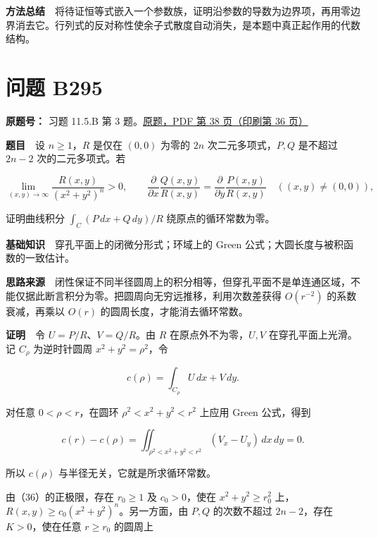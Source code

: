 \documentclass[11pt,a4paper]{article}
\begin{document}
\textbf{方法总结}　将待证恒等式嵌入一个参数族，证明沿参数的导数为边界项，再用零边界消去它。行列式的反对称性使余子式散度自动消失，是本题中真正起作用的代数结构。

\section{问题 B295}\label{ux95eeux9898-b295}

\textbf{原题号：} 习题 11.5.B 第 3
题。\href{https://zj139.github.io/math-notes/files/problems/楼分析习题-v2.pdf\#page=38}{原题，PDF
第 38 页（印刷第 36 页）}

\textbf{题目}　设 \(n\ge1\)，\(R\) 是仅在 \((0,0)\) 为零的 \(2n\)
次二元多项式，\(P,Q\) 是不超过 \(2n-2\) 次的二元多项式。若

\begin{equation}
\lim_{(x,y)\to\infty}\frac{R(x,y)}{(x^2+y^2)^n}>0,
\qquad
\frac{\partial}{\partial x}\frac{Q(x,y)}{R(x,y)}
=\frac{\partial}{\partial y}\frac{P(x,y)}{R(x,y)}
\quad((x,y)\ne(0,0)),
\tag{36}
\end{equation}

证明曲线积分 \(\int_C(P\,dx+Q\,dy)/R\) 绕原点的循环常数为零。

\textbf{基础知识}　穿孔平面上的闭微分形式；环域上的 Green
公式；大圆长度与被积函数的一致估计。

\textbf{思路来源}　闭性保证不同半径圆周上的积分相等，但穿孔平面不是单连通区域，不能仅据此断言积分为零。把圆周向无穷远推移，利用次数差获得
\(O(r^{-2})\) 的系数衰减，再乘以 \(O(r)\) 的圆周长度，才能消去循环常数。

\textbf{证明}　令 \(U=P/R\)、\(V=Q/R\)。由 \(R\) 在原点外不为零，\(U,V\)
在穿孔平面上光滑。记 \(C_\rho\) 为逆时针圆周 \(x^2+y^2=\rho^2\)，令

\begin{equation}
c(\rho)=\int_{C_\rho}U\,dx+V\,dy.
\tag{37}
\end{equation}

对任意 \(0<\rho<r\)，在圆环 \(\rho^2<x^2+y^2<r^2\) 上应用 Green
公式，得到

\begin{equation}
c(r)-c(\rho)
=\iint_{\rho^2<x^2+y^2<r^2}(V_x-U_y)\,dx\,dy=0.
\tag{38}
\end{equation}

所以 \(c(\rho)\) 与半径无关，它就是所求循环常数。

由（36）的正极限，存在 \(r_0\ge1\) 及 \(c_0>0\)，使在
\(x^2+y^2\ge r_0^2\) 上，\(R(x,y)\ge c_0(x^2+y^2)^n\)。另一方面，由
\(P,Q\) 的次数不超过 \(2n-2\)，存在 \(K>0\)，使在任意 \(r\ge r_0\)
的圆周上
\end{document}

